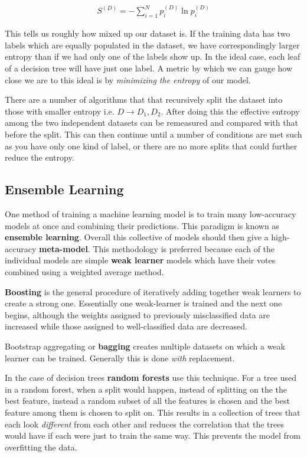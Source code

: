 \begin{align}
	S^{(D)} = -\sum_{i=1}^N p^{(D)}_i\ln p^{(D)}_i
\end{align}

This tells us roughly how mixed up our dataset is. If the training data has two labels which are equally populated in the dataset, we have correspondingly larger entropy than if we had only one of the labels show up. In the ideal case, each leaf of a decision tree will have just one label. A metric by which we can gauge how close we are to this ideal is by \emph{minimizing the entropy} of our model. 

There are a number of algorithms that that recursively split the dataset into those with smaller entropy i.e. $D\rightarrow D_1, D_2$. After doing this the effective entropy among the two independent datasets can be remeasured and compared with that before the split. This can then continue until a number of conditions are met such as you have only one kind of label, or there are no more splits that could further reduce the entropy.


\subsection{Ensemble Learning}

One method of training a machine learning model is to train many low-accuracy models at once and combining their predictions. This paradigm is known as \textbf{ensemble learning}. Overall this collective of models should then give a high-accuracy \textbf{meta-model}. This methodology is preferred because each of the individual models are simple \textbf{weak learner} models which have their votes combined using a weighted average method.

\textbf{Boosting} is the general procedure of iteratively adding together weak learners to create a strong one. Essentially one weak-learner is trained and the next one begins, although the weights assigned to previously misclassified data are increased while those assigned to well-classified data are decreased.

Bootstrap aggregating or \textbf{bagging} creates multiple datasets on which a weak learner can be trained. Generally this is done \emph{with} replacement. 

In the case of decision trees \textbf{random forests} use this technique. For a tree used in a random forest, when a split would happen, instead of splitting on the the best feature, instead a random subset of all the features is chosen and the best feature among them is chosen to split on. This results in a collection of trees that each look \emph{different} from each other and reduces the correlation that the trees would have if each were just to train the same way. This prevents the model from overfitting the data.



